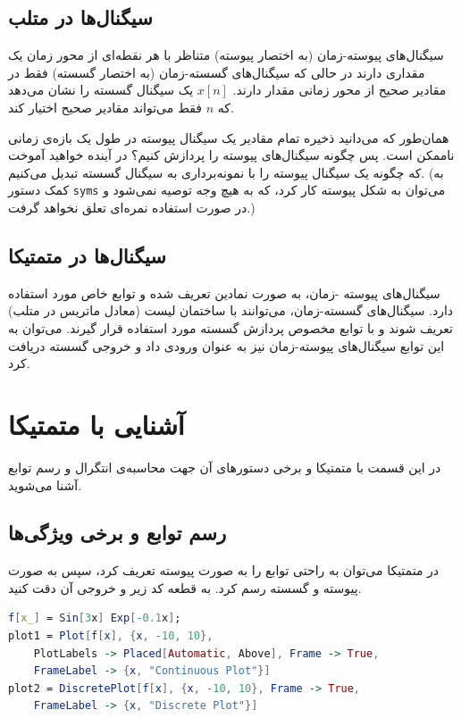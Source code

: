 \documentclass{utsignal}
\begin{document}
	\subsection{سیگنال‌ها در متلب}
	سیگنال‌های پیوسته-زمان  (به اختصار پیوسته) متناظر با هر نقطه‌ای از محور زمان یک مقداری دارند در حالی که سیگنال‌‌های گسسته-زمان (به اختصار گسسته) فقط در مقادیر صحیح از محور زمانی مقدار دارند. $x[n]$ یک سیگنال گسسته را نشان می‌دهد که $n$ فقط می‌تواند مقادیر صحیح اختیار کند.
	
	همان‌طور که می‌دانید ذخیره تمام مقادیر یک سیگنال پیوسته در طول یک بازه‌ی زمانی ناممکن است. پس چگونه سیگنال‌های پیوسته را پردازش کنیم؟ در آینده خواهید آموخت که چگونه یک سیگنال پیوسته را با نمونه‌برداری به سیگنال گسسته تبدیل می‌کنیم. (به کمک دستور \lstinline[language=Octave]{syms} می‌توان به شکل پیوسته کار کرد، که به هیچ وجه توصیه نمی‌شود و در صورت استفاده نمره‌ای تعلق نخواهد گرفت.)
	\subsection{سیگنال‌ها در متمتیکا}
	سیگنال‌های پیوسته -زمان، به صورت نمادین تعریف شده و توابع خاص مورد استفاده دارد. سیگنال‌های گسسته-زمان، می‌توانند با ساختمان لیست  (معادل ماتریس در متلب) تعریف شوند و با توابع مخصوص پردازش گسسته مورد استفاده قرار گیرند. می‌توان به این توابع سیگنال‌های پیوسته-زمان نیز به عنوان ورودی داد و خروجی گسسته دریافت کرد.
	\section{آشنایی با متمتیکا}
	در این قسمت با متمتیکا و برخی دستورهای آن جهت محاسبه‌ی انتگرال و رسم توابع آشنا می‌شوید.
	\subsection{رسم توابع و برخی ویژگی‌ها}
	در متمتیکا می‌توان به راحتی توابع را به صورت پیوسته تعریف کرد، سپس به صورت پیوسته و گسسته رسم کرد. به قطعه کد زیر و خروجی آن دقت کنید.
	\begin{latin}
		\renewcommand{\lstlistingname}{Listing}
		\begin{lstlisting}[extendedchars=true,language=Mathematica]
f[x_] = Sin[3x] Exp[-0.1x];
plot1 = Plot[f[x], {x, -10, 10}, 
	PlotLabels -> Placed[Automatic, Above], Frame -> True, 
	FrameLabel -> {x, "Continuous Plot"}]
plot2 = DiscretePlot[f[x], {x, -10, 10}, Frame -> True, 
	FrameLabel -> {x, "Discrete Plot"}]\end{lstlisting}
	\end{latin}
	
\end{document}
